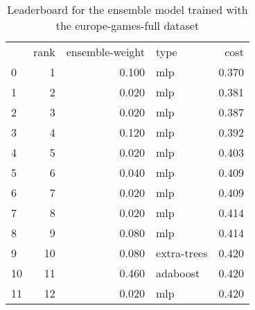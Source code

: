 \begin{table}[]
	\centering
	\begin{tabular}{lrrlr}
		   & rank & ensemble-weight & type        & cost  \\
		0  & 1    & 0.100           & mlp         & 0.370 \\
		1  & 2    & 0.020           & mlp         & 0.381 \\
		2  & 3    & 0.020           & mlp         & 0.387 \\
		3  & 4    & 0.120           & mlp         & 0.392 \\
		4  & 5    & 0.020           & mlp         & 0.403 \\
		5  & 6    & 0.040           & mlp         & 0.409 \\
		6  & 7    & 0.020           & mlp         & 0.409 \\
		7  & 8    & 0.020           & mlp         & 0.414 \\
		8  & 9    & 0.080           & mlp         & 0.414 \\
		9  & 10   & 0.080           & extra-trees & 0.420 \\
		10 & 11   & 0.460           & adaboost    & 0.420 \\
		11 & 12   & 0.020           & mlp         & 0.420 \\
	\end{tabular}

	\caption{Leaderboard for the ensemble model trained with the europe-games-full dataset}
	\label{tab:lb-europe-games-full-autoencode}
\end{table}

